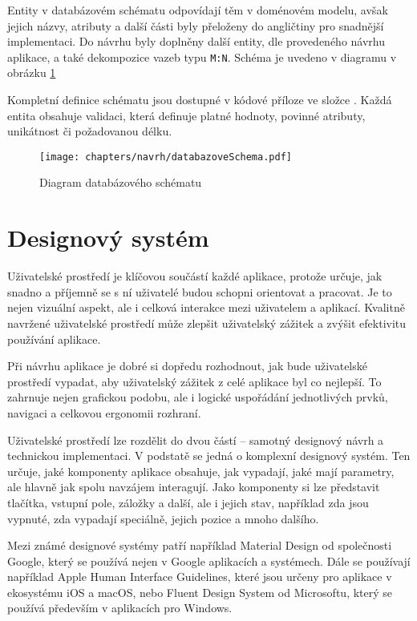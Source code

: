 Entity v databázovém schématu odpovídají těm v doménovém modelu, avšak jejich názvy, atributy a další části byly přeloženy do angličtiny pro snadnější implementaci. 
Do návrhu byly doplněny další entity, dle provedeného návrhu aplikace, a také dekompozice vazeb typu \texttt{M:N}. 
Schéma je uvedeno v diagramu v obrázku \ref{fig:databazoveSchema}

Kompletní definice schématu jsou dostupné v kódové příloze ve složce . 
Každá entita obsahuje validaci, která definuje platné hodnoty, povinné atributy, unikátnost či požadovanou délku.

\begin{figure}[ht!]
    \centering
    \texttt{[image: chapters/navrh/databazoveSchema.pdf]}
    \caption{Diagram databázového schématu}\label{fig:databazoveSchema}
\end{figure}

\section{Designový systém}

Uživatelské prostředí je klíčovou součástí každé aplikace, protože určuje, jak snadno a příjemně se s ní uživatelé budou schopni orientovat a pracovat. 
Je to nejen vizuální aspekt, ale i celková interakce mezi uživatelem a aplikací. Kvalitně navržené uživatelské prostředí může zlepšit uživatelský zážitek a zvýšit efektivitu používání aplikace.

Při návrhu aplikace je dobré si dopředu rozhodnout, jak bude uživatelské prostředí vypadat, aby uživatelský zážitek z celé aplikace byl co nejlepší. 
To zahrnuje nejen grafickou podobu, ale i logické uspořádání jednotlivých prvků, navigaci a celkovou ergonomii rozhraní.

Uživatelské prostředí lze rozdělit do dvou částí -- samotný designový návrh a technickou implementaci. 
V podstatě se jedná o komplexní designový systém. Ten určuje, jaké komponenty aplikace obsahuje, jak vypadají, jaké mají parametry, ale hlavně jak spolu navzájem interagují. 
Jako komponenty si lze představit tlačítka, vstupní pole, záložky a další, ale i jejich stav, například zda jsou vypnuté, zda vypadají speciálně, jejich pozice a mnoho dalšího.

Mezi známé designové systémy patří například Material Design od společnosti Google, který se používá nejen v Google aplikacích a systémech. 
Dále se používají například Apple Human Interface Guidelines, které jsou určeny pro aplikace v ekosystému iOS a macOS, nebo Fluent Design System od Microsoftu, který se používá především v aplikacích pro Windows.

